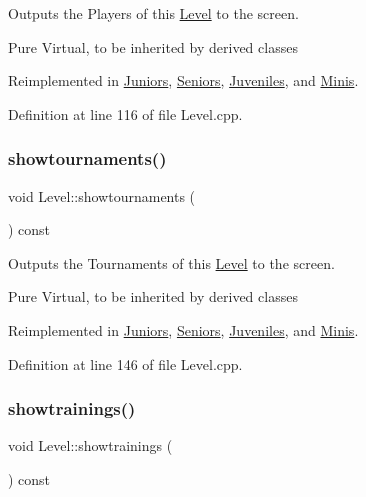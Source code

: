 Outputs the Players of this \hyperlink{class_level}{Level} to the screen. 

Pure Virtual, to be inherited by derived classes 

Reimplemented in \hyperlink{class_juniors_aa312c32ccc0c9d3193036c20849b8669}{Juniors}, \hyperlink{class_seniors_a671c22ddbb0c2df27adf12364db0380a}{Seniors}, \hyperlink{class_juveniles_ae66be24e5e17ce8583ff59c45ff4a772}{Juveniles}, and \hyperlink{class_minis_a062ba8858c80dcf52c792e5304ccbfeb}{Minis}.



Definition at line 116 of file Level.\+cpp.

\hypertarget{class_level_a757c4547f3b8f7c7ecb02c7e0e6cd7c9}{}\label{class_level_a757c4547f3b8f7c7ecb02c7e0e6cd7c9} 
\subsubsection{\texorpdfstring{showtournaments()}{showtournaments()}}
{\footnotesize\ttfamily void Level\+::showtournaments (\begin{DoxyParamCaption}{ }\end{DoxyParamCaption}) const\hspace{0.3cm}{\ttfamily [virtual]}}



Outputs the Tournaments of this \hyperlink{class_level}{Level} to the screen. 

Pure Virtual, to be inherited by derived classes 

Reimplemented in \hyperlink{class_juniors_a05afe7596b708ad635ac709499e66bc1}{Juniors}, \hyperlink{class_seniors_a5782adf80e1221220aa9e7bcaca5a3e3}{Seniors}, \hyperlink{class_juveniles_a8502c64d6a2cefda618003da25db3cda}{Juveniles}, and \hyperlink{class_minis_a1a8d585f0c4b745c9c703cc6449c778d}{Minis}.



Definition at line 146 of file Level.\+cpp.

\hypertarget{class_level_a4101cb725b1fd0c0836834c92b190363}{}\label{class_level_a4101cb725b1fd0c0836834c92b190363} 
\subsubsection{\texorpdfstring{showtrainings()}{showtrainings()}}
{\footnotesize\ttfamily void Level\+::showtrainings (\begin{DoxyParamCaption}{ }\end{DoxyParamCaption}) const\hspace{0.3cm}{\ttfamily [virtual]}}



